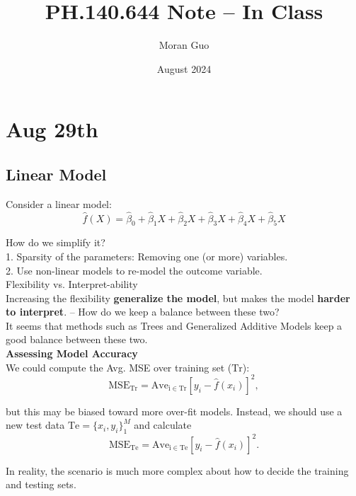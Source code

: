 \documentclass{article}
\title{PH.140.644 Note -- In Class}
\author{Moran Guo}
\date{August 2024}
\begin{document}
\maketitle

\section{Aug 29th}
\subsection{Linear Model}
Consider a linear model: $$\hat{f}(X) = \hat{\beta}_0 + \hat{\beta}_1 X + \hat{\beta}_2 X + \hat{\beta}_3 X + \hat{\beta}_4 X + \hat{\beta}_5 X$$

How do we simplify it?\\

1. Sparsity of the parameters: Removing one (or more) variables.\\

2. Use non-linear models to re-model the outcome variable.\\

\noindent Flexibility vs. Interpret-ability\\

Increasing the flexibility \textbf{generalize the model}, but makes the model \textbf{harder to interpret}. -- How do we keep a balance between these two?\\

It seems that methods such as Trees and Generalized Additive Models keep a good balance between these two.\\

\noindent \textbf{Assessing Model Accuracy}\\

We could compute the Avg. MSE over training set ($\mathrm{Tr}$): $$\mathrm{MSE_{Tr}} = \mathrm{Ave_{i \in Tr}}[y_i - \hat{f}(x_i)]^2,$$

but this may be biased toward more over-fit models. Instead, we should use a new test data $\mathrm{Te} = \{x_i, y_i\}_1^M$ and calculate $$\mathrm{MSE_{Te}} = \mathrm{Ave_{i \in Te}}[y_i - \hat{f}(x_i)]^2.$$

In reality, the scenario is much more complex about how to decide the training and testing sets.
\end{document}
